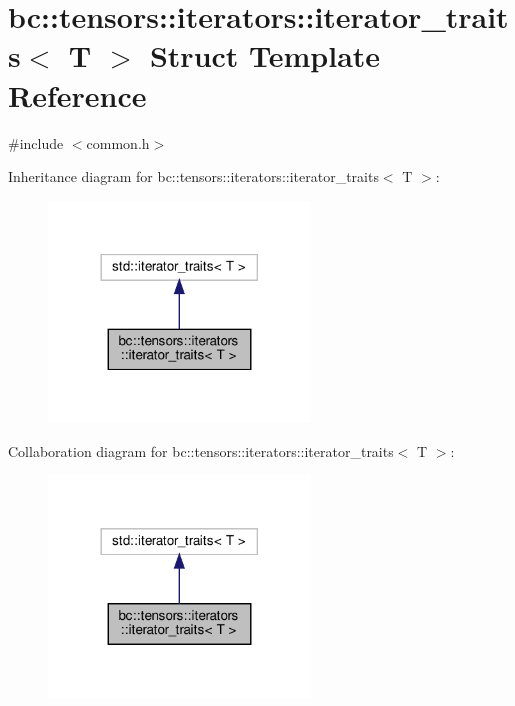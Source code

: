 \hypertarget{structbc_1_1tensors_1_1iterators_1_1iterator__traits}{}\section{bc\+:\+:tensors\+:\+:iterators\+:\+:iterator\+\_\+traits$<$ T $>$ Struct Template Reference}
\label{structbc_1_1tensors_1_1iterators_1_1iterator__traits}


{\ttfamily \#include $<$common.\+h$>$}



Inheritance diagram for bc\+:\+:tensors\+:\+:iterators\+:\+:iterator\+\_\+traits$<$ T $>$\+:\nopagebreak
\begin{figure}[H]
\begin{center}
\leavevmode
\includegraphics[width=197pt]{structbc_1_1tensors_1_1iterators_1_1iterator__traits__inherit__graph}
\end{center}
\end{figure}


Collaboration diagram for bc\+:\+:tensors\+:\+:iterators\+:\+:iterator\+\_\+traits$<$ T $>$\+:\nopagebreak
\begin{figure}[H]
\begin{center}
\leavevmode
\includegraphics[width=197pt]{structbc_1_1tensors_1_1iterators_1_1iterator__traits__coll__graph}
\end{center}
\end{figure}
